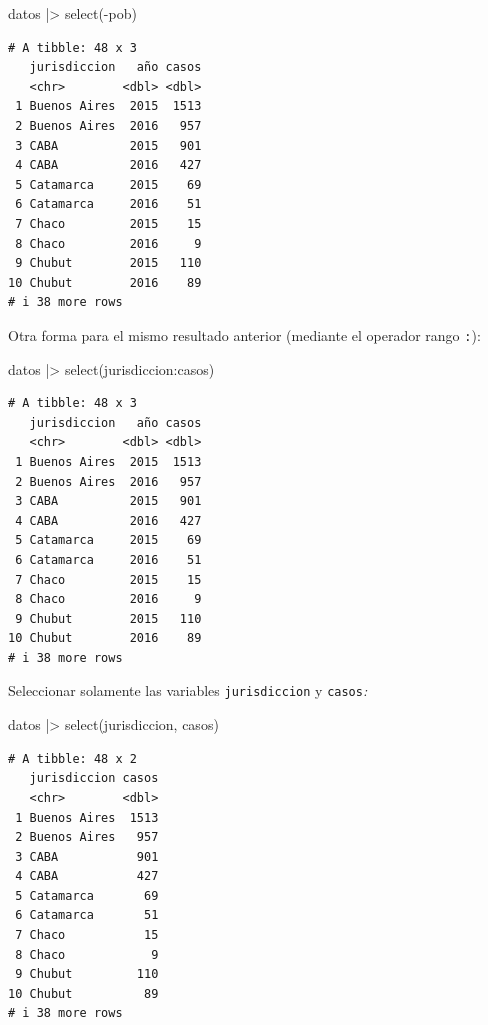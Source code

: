 \documentclass[
  spanish,
  a4paper,
]{scrbook}
\newenvironment{Shaded}{\begin{snugshade}}{\end{snugshade}}
\newcommand{\FunctionTok}[1]{\textcolor[rgb]{0.28,0.35,0.67}{#1}}
\newcommand{\NormalTok}[1]{\textcolor[rgb]{0.00,0.23,0.31}{#1}}
\newcommand{\SpecialCharTok}[1]{\textcolor[rgb]{0.37,0.37,0.37}{#1}}
\begin{document}
\begin{Shaded}
\begin{Highlighting}[]
\NormalTok{datos }\SpecialCharTok{|\textgreater{}}
  \FunctionTok{select}\NormalTok{(}\SpecialCharTok{{-}}\NormalTok{pob)}
\end{Highlighting}
\end{Shaded}

\begin{verbatim}
# A tibble: 48 x 3
   jurisdiccion   año casos
   <chr>        <dbl> <dbl>
 1 Buenos Aires  2015  1513
 2 Buenos Aires  2016   957
 3 CABA          2015   901
 4 CABA          2016   427
 5 Catamarca     2015    69
 6 Catamarca     2016    51
 7 Chaco         2015    15
 8 Chaco         2016     9
 9 Chubut        2015   110
10 Chubut        2016    89
# i 38 more rows
\end{verbatim}

Otra forma para el mismo resultado anterior (mediante el operador rango
\texttt{:}):

\begin{Shaded}
\begin{Highlighting}[]
\NormalTok{datos }\SpecialCharTok{|\textgreater{}}
  \FunctionTok{select}\NormalTok{(jurisdiccion}\SpecialCharTok{:}\NormalTok{casos)}
\end{Highlighting}
\end{Shaded}

\begin{verbatim}
# A tibble: 48 x 3
   jurisdiccion   año casos
   <chr>        <dbl> <dbl>
 1 Buenos Aires  2015  1513
 2 Buenos Aires  2016   957
 3 CABA          2015   901
 4 CABA          2016   427
 5 Catamarca     2015    69
 6 Catamarca     2016    51
 7 Chaco         2015    15
 8 Chaco         2016     9
 9 Chubut        2015   110
10 Chubut        2016    89
# i 38 more rows
\end{verbatim}

Seleccionar solamente las variables \texttt{jurisdiccion} y
\texttt{casos}\emph{:}

\begin{Shaded}
\begin{Highlighting}[]
\NormalTok{datos }\SpecialCharTok{|\textgreater{}}
  \FunctionTok{select}\NormalTok{(jurisdiccion, casos)}
\end{Highlighting}
\end{Shaded}

\begin{verbatim}
# A tibble: 48 x 2
   jurisdiccion casos
   <chr>        <dbl>
 1 Buenos Aires  1513
 2 Buenos Aires   957
 3 CABA           901
 4 CABA           427
 5 Catamarca       69
 6 Catamarca       51
 7 Chaco           15
 8 Chaco            9
 9 Chubut         110
10 Chubut          89
# i 38 more rows
\end{verbatim}
\end{document}
